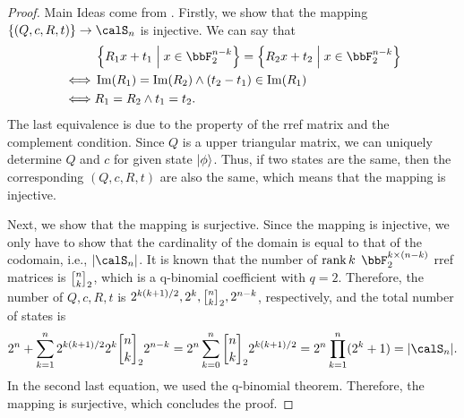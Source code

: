 \documentclass[\main/main]{subfiles}
\begin{document}
\begin{proof}
  Main Ideas come from \cite{struchalinExperimentalEstimationQuantum2021b}.
  Firstly, we show that the mapping $\{(Q,c,R,t)\} \to \calS_n$ is injective.
  We can say that
  \begin{align*}
         & \left\{R_1 x + t_1 \;\middle|\; x \in \bbF_2^{n-k} \right\} = \left\{R_2 x + t_2 \;\middle|\; x \in \bbF_2^{n-k} \right\} \\
    \iff & \Im(R_1)=\Im(R_2) \land (t_2-t_1) \in \Im(R_1)                                                                            \\
    \iff & R_1 = R_2 \land t_1 = t_2.
  \end{align*}
  The last equivalence is due to the
  property of the rref matrix and the complement condition.
  Since $Q$ is a upper triangular matrix,
  we can uniquely determine $Q$ and $c$
  for given state $\ket{\phi}$.
  Thus, if two states are the same,
  then the corresponding $(Q,c,R,t)$ are also the same,
  which means that the mapping is injective.

  Next, we show that the mapping is surjective.
  Since the mapping is injective, we only have to show
  that the cardinality of the domain is equal to that of the codomain, i.e., $\abs{\calS_n}$.
  It is known that the number of $\rank k$ $\bbF_2^{k \times (n-k)}$ rref matrices is
  $\qBinom{n}{k}_2$, which is a q-binomial coefficient with $q=2$.
  Therefore, the number of $Q,c,R,t$ is
  $2^{k(k+1)/2},2^k,\qBinom{n}{k}_2,2^{n-k}$, respectively,
  and the total number of states is
  \begin{equation*}
    2^n + \sum_{k=1}^{n} 2^{k(k+1)/2} 2^k \qBinom{n}{k}_2 2^{n-k} \\
    = 2^n \sum_{k=0}^{n} \qBinom{n}{k}_2 2^{k(k+1)/2}               \\
    = 2^n \prod_{k=1}^{n} (2^k+1)
    = \abs{\calS_n}.
  \end{equation*}
  In the second last equation, we used the q-binomial theorem.
  Therefore, the mapping is surjective, which concludes the proof.
\end{proof}
\end{document}

